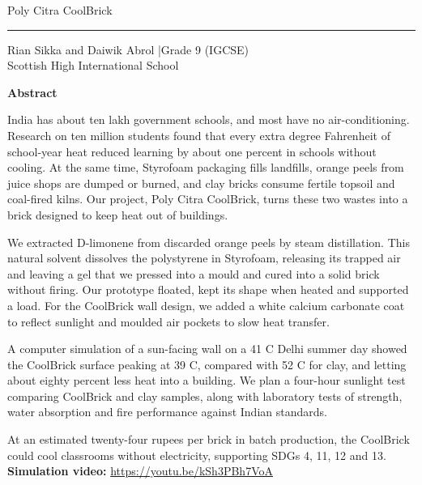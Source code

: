 \documentclass[11pt,a4paper]{article}
\begin{document}
{\fontsize{24}{28}\selectfont\color{blue!60!black} Poly Citra CoolBrick}\par
{\color{blue}\rule{\textwidth}{0.8pt}}\par
Rian Sikka and Daiwik Abrol \quad|\quad Grade 9 (IGCSE)\\ Scottish High International School
\vspace{10pt}

{\large\bfseries\color{accent} Abstract}\par
India has about ten lakh government schools, and most have no air-conditioning. Research on ten million students found that every extra degree Fahrenheit of school-year heat reduced learning by about one percent in schools without cooling. At the same time, Styrofoam packaging fills landfills, orange peels from juice shops are dumped or burned, and clay bricks consume fertile topsoil and coal-fired kilns. Our project, Poly Citra CoolBrick, turns these two wastes into a brick designed to keep heat out of buildings.

We extracted D-limonene from discarded orange peels by steam distillation. This natural solvent dissolves the polystyrene in Styrofoam, releasing its trapped air and leaving a gel that we pressed into a mould and cured into a solid brick without firing. Our prototype floated, kept its shape when heated and supported a load. For the CoolBrick wall design, we added a white calcium carbonate coat to reflect sunlight and moulded air pockets to slow heat transfer.

A computer simulation of a sun-facing wall on a 41 \textdegree C Delhi summer day showed the CoolBrick surface peaking at 39 \textdegree C, compared with 52 \textdegree C for clay, and letting about eighty percent less heat into a building. We plan a four-hour sunlight test comparing CoolBrick and clay samples, along with laboratory tests of strength, water absorption and fire performance against Indian standards.

At an estimated twenty-four rupees per brick in batch production, the CoolBrick could cool classrooms without electricity, supporting SDGs 4, 11, 12 and 13.
\textbf{Simulation video:} \url{https://youtu.be/kSh3PBh7VoA}
\end{document}
